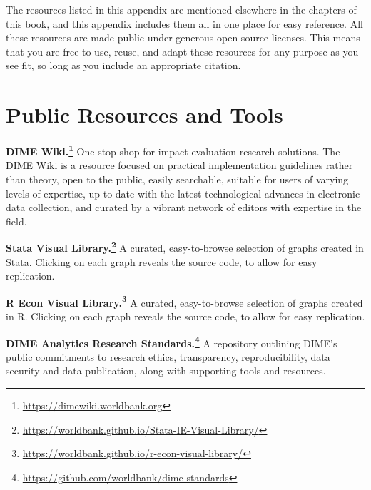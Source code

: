 
\newcommand{\resourcepar}{\vspace{.75\baselineskip}\noindent}




The resources listed in this appendix
are mentioned elsewhere in the chapters of this book,
and this appendix includes them all
in one place for easy reference.
All these resources are made public
under generous open-source licenses.
This means that you are free to use, reuse, and adapt these resources
for any purpose as you see fit,
so long as you include an appropriate citation.




\section{Public Resources and Tools}

\textbf{DIME Wiki.\footnote{
		\url{https://dimewiki.worldbank.org}}}
One-stop shop for impact evaluation research solutions.
The DIME Wiki is a resource focused on
practical implementation guidelines rather than theory,
open to the public, easily searchable,
suitable for users of varying levels of expertise,
up-to-date with the latest technological advances
in electronic data collection,
and curated by a vibrant network of editors
with expertise in the field.

\resourcepar\textbf{Stata Visual Library.\footnote{
		\url{https://worldbank.github.io/Stata-IE-Visual-Library/}}}
A curated, easy-to-browse selection of graphs created in Stata.
Clicking on each graph reveals the source code,
to allow for easy replication.

\resourcepar\textbf{R Econ Visual Library.\footnote{
		\url{https://worldbank.github.io/r-econ-visual-library/}}}
A curated, easy-to-browse selection of graphs created in R.
Clicking on each graph reveals the source code,
to allow for easy replication.

\resourcepar\textbf{DIME Analytics Research Standards.\footnote{
		\url{https://github.com/worldbank/dime-standards}}}
A repository outlining DIME's public commitments to
research ethics, transparency, reproducibility,
data security and data publication,
along with supporting tools and resources.



